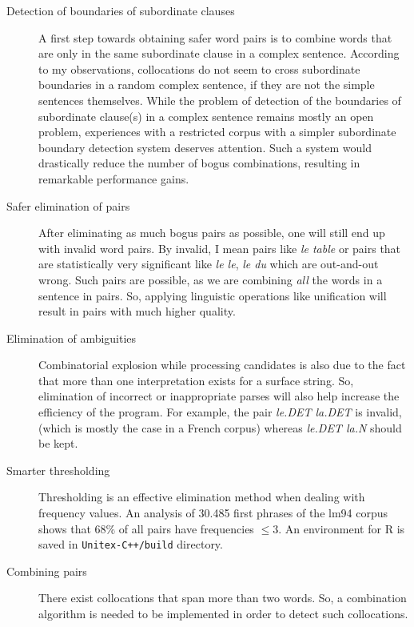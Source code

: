 \documentclass[a4paper,12pt,oneside]{article}
\begin{document}
\begin{description}
\item[Detection of boundaries of subordinate clauses]
	A first step towards obtaining safer word pairs is to combine words that are only in the same subordinate clause in a complex sentence. According to my observations, collocations do not seem to cross subordinate boundaries in a random complex sentence, if they are not the simple sentences themselves. While the problem of detection of the boundaries of subordinate clause(s) in a complex sentence remains mostly an open problem, experiences with a restricted corpus with a simpler subordinate boundary detection system deserves attention. Such a system would drastically reduce the number of bogus combinations, resulting in remarkable performance gains.

\item[Safer elimination of pairs]
	After eliminating as much bogus pairs as possible, one will still end up with invalid word pairs. By invalid, I mean pairs like \emph{le table} or pairs that are statistically very significant like \emph{le le}, \emph{le du} which are out-and-out wrong. Such pairs are possible, as we are combining \emph{all} the words in a sentence in pairs. So, applying linguistic operations like unification will result in pairs with much higher quality.

\item[Elimination of ambiguities]
	Combinatorial explosion while processing candidates is also due to the fact that more than one interpretation exists for a surface string. So, elimination of incorrect or inappropriate parses will also help increase the efficiency of the program. For example, the pair \emph{le.DET la.DET} is invalid, (which is mostly the case in a French corpus) whereas \emph{le.DET la.N} should be kept.

\item[Smarter thresholding]
	Thresholding is an effective elimination method when dealing with frequency values. An analysis of 30.485 first phrases of the lm94 corpus shows that 68\% of all pairs have frequencies $\leq 3$. An environment for R\cite{RProject} is saved in \texttt{Unitex-C++/build} directory.

\item[Combining pairs]
	There exist collocations that span more than two words. So, a combination algorithm is needed to be implemented in order to detect such collocations.

\end{description}
\end{document}
